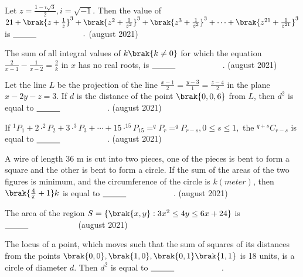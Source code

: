 \iffalse
\title{08-26-2021-shift-1-16-30}
\author{AI24BTECH11011}
\section{mains}
\fi
  \item Let $z=\frac{1-i\sqrt{3}}{2},i=\sqrt{-1}$. Then the value of $21+\brak{z+\frac{1}{z}}^{3}+\brak{z^{2}+\frac{1}{z^{2}}}^{3}+\brak{z^{3}+\frac{1}{z^{3}}}^{3}+\cdots+\brak{z^{21}+\frac{1}{z^{21}}}^{3}$ is $\makebox[3cm][l]{\underline{\hspace{1cm}}}.$
      \hfill{(august 2021)}  
      \item  The sum of all integral values of $k\brak{k\neq 0}$ for which the equation $\frac{2}{x-1}-\frac{1}{x-2}=\frac{2}{k}$ in $x$ has no real roots, is  $\makebox[3cm][l]{\underline{\hspace{1cm}}}$.
       \hfill{(august 2021)}  
       \item Let the line $L$ be the projection of the line $\frac{x-1}{2}=\frac{y-3}{1}=\frac{z-4}{2}$ in the plane $x-2y-z=3$. If $d$ is the distance of the point $\brak{0, 0, 6}$ from $L$, then $d^{2}$ is equal to $\makebox[3cm][l]{\underline{\hspace{1cm}}}$.
        \hfill{(august 2021)}  
\item If $^{1}P_{1}+2\cdot^{2}P_{2}+3\cdot^{3}P_{3}+\cdots+15\cdot^{15}P_{15}=^{q}P_{r}=^{q}P_{r-s},0\leq s\leq1,$ the $^{q+s}C_{r-s}$ is equal to $\makebox[3cm][l]{\underline{\hspace{1cm}}}$.
\hfill{(august 2021)}  
\item A wire of length 36 m is cut into two pieces, one of the pieces is bent to form a square and the other is bent to form a circle. If the sum of the areas of the two figures is minimum, and the circumference of the circle is $k (meter)$, then $\brak{\frac{4}{\pi}+1}k$ is equal to $\makebox[3cm][l]{\underline{\hspace{1cm}}}$.
\hfill{(august 2021)}  
\item The area of the region $S=\{\brak{x,y}:3x^2 \leq 4y \leq 6x+24\}$ is $\makebox[3cm][l]{\underline{\hspace{1cm}}}$
\hfill{(august 2021)}  
\item The locus of a point, which moves such that the sum of squares of its distances from the points $\brak{0, 0}, \brak{1, 0}, \brak{0, 1} \brak{1, 1}$ is 18 units, is a circle of diameter $d$. Then $d^2$ is equal to $\makebox[3cm][l]{\underline{\hspace{1cm}}}$.
